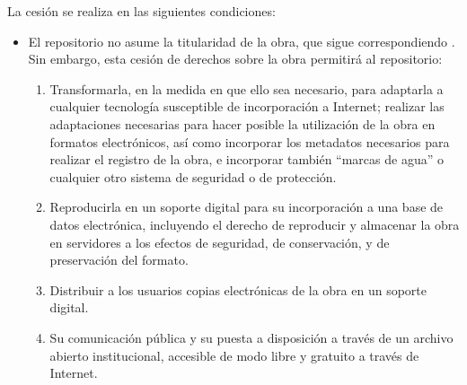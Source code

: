 \documentclass[12pt,a4paper,oneside]{article}
\begin{document}
La cesión se realiza en las siguientes condiciones:

\begin{itemize}

\item El repositorio no asume la titularidad de la obra, que sigue
  correspondiendo \wordAutorAlOrALa{} \wordAutorOrAutora{}. Sin embargo,
  esta cesión de derechos sobre la obra permitirá al repositorio:

  \begin{enumerate}[label=\alph*]
  \item Transformarla, en la medida en que ello sea necesario, para
    adaptarla a cualquier tecnología susceptible de incorporación a
    Internet; realizar las adaptaciones necesarias para hacer posible la
    utilización de la obra en formatos electrónicos, así como incorporar
    los metadatos necesarios para realizar el registro de la obra, e
    incorporar también ``marcas de agua'' o cualquier otro sistema de
    seguridad o de protección.
  \item Reproducirla en un soporte digital para su incorporación a una
    base de datos electrónica, incluyendo el derecho de reproducir y
    almacenar la obra en servidores a los efectos de seguridad, de
    conservación, y de preservación del formato.
  \item Distribuir a los usuarios copias electrónicas de la obra en un
    soporte digital.
  \item Su comunicación pública y su puesta a disposición a través de un
    archivo abierto institucional, accesible de modo libre y gratuito a
    través de Internet.
  \end{enumerate}


\end{itemize}
\end{document}
